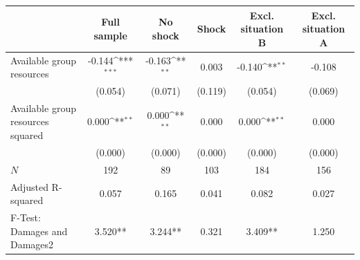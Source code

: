 {
\def\sym#1{\ifmmode^{#1}\else\(^{#1}\)\fi}
\begin{tabular}{l*{5}{c}}
\toprule
            &\multicolumn{1}{c}{Full sample}&\multicolumn{1}{c}{No shock}&\multicolumn{1}{c}{Shock}&\multicolumn{1}{c}{Excl. situation B}&\multicolumn{1}{c}{Excl. situation A}\\
\midrule
Available group resources&      -0.144\sym{***}&      -0.163\sym{**} &       0.003         &      -0.140\sym{**} &      -0.108         \\
            &     (0.054)         &     (0.071)         &     (0.119)         &     (0.054)         &     (0.069)         \\
\addlinespace
Available group resources squared&       0.000\sym{**} &       0.000\sym{**} &       0.000         &       0.000\sym{**} &       0.000         \\
            &     (0.000)         &     (0.000)         &     (0.000)         &     (0.000)         &     (0.000)         \\
\midrule
\(N\)       &         192         &          89         &         103         &         184         &         156         \\
Adjusted R-squared&       0.057         &       0.165         &       0.041         &       0.082         &       0.027         \\
F-Test: Damages and Damages2&     3.520**         &     3.244**         &       0.321         &     3.409**         &       1.250         \\
\bottomrule
\end{tabular}
}
